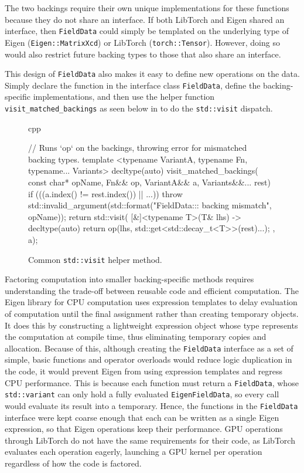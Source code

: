 The two backings require their own unique implementations for these functions because they do not share an interface. 
If both LibTorch and Eigen shared an interface, then \texttt{FieldData} could simply be templated on the underlying type of Eigen 
(\texttt{Eigen::MatrixXcd}) or LibTorch (\texttt{torch::Tensor}). However, doing so would also restrict future backing types to those that also share an interface.

This design of \texttt{FieldData} also makes it easy to define new operations on the data. 
Simply declare the function in the interface class \texttt{FieldData}, define the backing-specific implementations, and then use the helper function
\texttt{visit\_matched\_backings} as seen below in  to do the \texttt{std::visit} dispatch.

\begin{figure}
\begin{code}{cpp}

// Runs `op` on the backings, throwing error for mismatched backing types.
template <typename VariantA, typename Fn, typename... Variants>
decltype(auto) visit_matched_backings(
    const char* opName, Fn&& op, VariantA&& a, Variants&&... rest) {
    if (((a.index() != rest.index()) || ...)) {
        throw std::invalid_argument(std::format("FieldData::{}: backing mismatch", opName));
    }
    return std::visit(
        [&]<typename T>(T& lhs) -> decltype(auto) {
            return op(lhs, std::get<std::decay_t<T>>(rest)...);
        }, a);
}

\end{code}
  \caption{Common \texttt{std::visit} helper method.}
  \label{fig:visit_matched_backings}
\end{figure}

Factoring computation into smaller backing-specific methods requires understanding the trade-off between reusable code and efficient computation.
The Eigen library for CPU computation uses expression templates to delay evaluation of computation until the final assignment rather than creating temporary objects.
It does this by constructing a lightweight expression object whose type represents the computation at compile time, thus eliminating temporary copies and allocation.
Because of this, although creating the \texttt{FieldData} interface as a set of simple, basic functions and operator overloads would reduce logic duplication in the code, it would prevent Eigen from using expression templates and regress CPU performance.
This is because each function must return a \texttt{FieldData}, whose \texttt{std::variant} can only hold a fully evaluated \texttt{EigenFieldData}, so every call would evaluate its result into a temporary.
Hence, the functions in the \texttt{FieldData} interface were kept coarse enough that each can be written as a single Eigen expression, so that Eigen operations keep their performance.
GPU operations through LibTorch do not have the same requirements for their code, as LibTorch evaluates each operation eagerly, launching a GPU kernel per operation regardless of how the code is factored.


